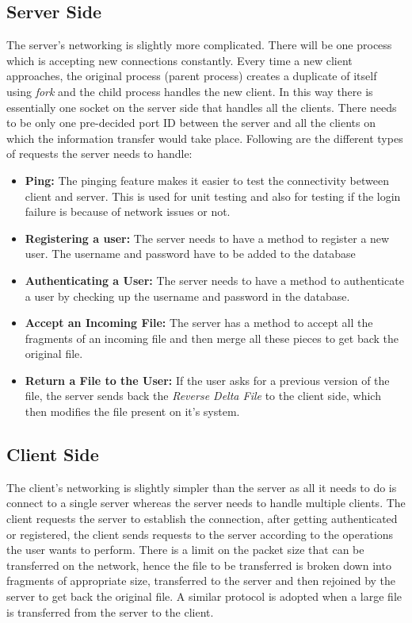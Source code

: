 \documentclass[]{article}
\begin{document}
\subsection{Server Side}
The server's networking is slightly more complicated. There will be one process which is accepting new connections constantly. Every time a new client approaches, the original process (parent process) creates a duplicate of itself using \textit{fork} and the child process handles the new client. In this way there is essentially one socket on the server side that handles all the clients. There needs to be only one pre-decided port ID between the server and all the clients on which the information transfer would take place. Following are the different types of requests the server needs to handle:\\
\begin{itemize}
\item \textbf{Ping:} 
The pinging feature makes it easier to test the connectivity between client and server. This is used for unit testing and also for testing if the login failure is because of network issues or not.

\item \textbf{Registering a user:}
The server needs to have a method to register a new user. The username and password have to be added to the database

\item \textbf{Authenticating a User:}
The server needs to have a method to authenticate a user by checking up the username and password in the database. 

\item \textbf{Accept an Incoming File:}
The server has a method to accept all the fragments of an incoming file and then merge all these pieces to get back the original file.

\item \textbf{Return a File to the User:}
If the user asks for a previous version of the file, the server sends back the \textit{Reverse Delta File} to the client side, which then modifies the file present on it's system.

\end{itemize} 

\subsection{Client Side}
The client's networking is slightly simpler than the server as all it needs to do is connect to a single server whereas the server needs to handle multiple clients. The client requests the server to establish the connection, after getting authenticated or registered, the client sends requests to the server according to the operations the user wants to perform. There is a limit on the packet size that can be transferred on the network, hence the file to be transferred is broken down into fragments of appropriate size, transferred to the server and then rejoined by the server to get back the original file. A similar protocol is adopted when a large file is transferred from the server to the client.
\end{document}
